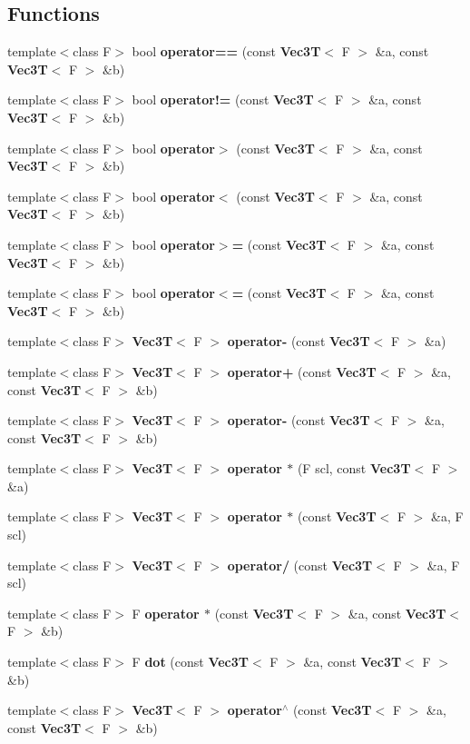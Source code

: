 \subsection*{Functions}
\begin{CompactItemize}
\item 
template$<$class F$>$ bool {\bf operator==} (const {\bf Vec3T}$<$ F $>$ \&a, const {\bf Vec3T}$<$ F $>$ \&b)
\item 
template$<$class F$>$ bool {\bf operator!=} (const {\bf Vec3T}$<$ F $>$ \&a, const {\bf Vec3T}$<$ F $>$ \&b)
\item 
template$<$class F$>$ bool {\bf operator$>$} (const {\bf Vec3T}$<$ F $>$ \&a, const {\bf Vec3T}$<$ F $>$ \&b)
\item 
template$<$class F$>$ bool {\bf operator$<$} (const {\bf Vec3T}$<$ F $>$ \&a, const {\bf Vec3T}$<$ F $>$ \&b)
\item 
template$<$class F$>$ bool {\bf operator$>$=} (const {\bf Vec3T}$<$ F $>$ \&a, const {\bf Vec3T}$<$ F $>$ \&b)
\item 
template$<$class F$>$ bool {\bf operator$<$=} (const {\bf Vec3T}$<$ F $>$ \&a, const {\bf Vec3T}$<$ F $>$ \&b)
\item 
template$<$class F$>$ {\bf Vec3T}$<$ F $>$ {\bf operator-} (const {\bf Vec3T}$<$ F $>$ \&a)
\item 
template$<$class F$>$ {\bf Vec3T}$<$ F $>$ {\bf operator+} (const {\bf Vec3T}$<$ F $>$ \&a, const {\bf Vec3T}$<$ F $>$ \&b)
\item 
template$<$class F$>$ {\bf Vec3T}$<$ F $>$ {\bf operator-} (const {\bf Vec3T}$<$ F $>$ \&a, const {\bf Vec3T}$<$ F $>$ \&b)
\item 
template$<$class F$>$ {\bf Vec3T}$<$ F $>$ {\bf operator $\ast$} (F scl, const {\bf Vec3T}$<$ F $>$ \&a)
\item 
template$<$class F$>$ {\bf Vec3T}$<$ F $>$ {\bf operator $\ast$} (const {\bf Vec3T}$<$ F $>$ \&a, F scl)
\item 
template$<$class F$>$ {\bf Vec3T}$<$ F $>$ {\bf operator/} (const {\bf Vec3T}$<$ F $>$ \&a, F scl)
\item 
template$<$class F$>$ F {\bf operator $\ast$} (const {\bf Vec3T}$<$ F $>$ \&a, const {\bf Vec3T}$<$ F $>$ \&b)
\item 
template$<$class F$>$ F {\bf dot} (const {\bf Vec3T}$<$ F $>$ \&a, const {\bf Vec3T}$<$ F $>$ \&b)
\item 
template$<$class F$>$ {\bf Vec3T}$<$ F $>$ {\bf operator$^\wedge$} (const {\bf Vec3T}$<$ F $>$ \&a, const {\bf Vec3T}$<$ F $>$ \&b)

\end{CompactItemize}
